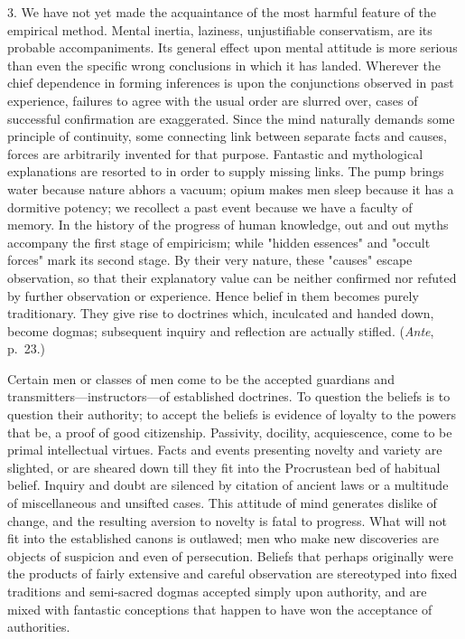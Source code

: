 \documentclass[showtrims,ustradepaper]{memoir}
\begin{document}

3. We have not yet made the acquaintance of the most harmful feature of
the empirical method. Mental inertia, laziness, unjustifiable
conservatism, are its probable accompaniments. Its general effect upon
mental attitude is more serious than even the specific wrong conclusions
in which it has landed. Wherever the chief dependence in forming
inferences is upon the conjunctions observed in past experience,
failures to agree with the usual order are slurred over, cases of
successful confirmation are exaggerated. Since the mind naturally
demands some principle of continuity, some connecting link between
separate facts and causes, forces are arbitrarily invented for that
purpose. Fantastic and mythological explanations are resorted to in
order to supply missing links. The pump brings water because nature
abhors a vacuum; opium makes men sleep because it has a
dormitive
potency; we recollect a past event because we have a faculty of memory.
In the history of the progress of human knowledge, out and out myths
accompany the first stage of empiricism; while "hidden essences" and
"occult forces" mark its second stage. By their very nature, these
"causes" escape observation, so that their explanatory value can be
neither confirmed nor refuted by further observation or experience.
Hence belief in them becomes purely traditionary. They give rise to
doctrines which, inculcated and handed down, become dogmas; subsequent
inquiry and reflection are actually stifled. (\emph{Ante}, p.\ 23.)


Certain men or classes of men come to be the accepted guardians and
transmitters---instructors---of established doctrines. To question the
beliefs is to question their authority; to accept the beliefs is
evidence of loyalty to the powers that be, a proof of good citizenship.
Passivity, docility, acquiescence, come to be primal intellectual
virtues. Facts and events presenting novelty and variety are slighted,
or are sheared down till they fit into the Procrustean bed of habitual
belief. Inquiry and doubt are silenced by citation of ancient laws or a
multitude of miscellaneous and unsifted cases. This attitude of mind
generates dislike of change, and the resulting aversion to novelty is
fatal to progress. What will not fit into the established canons is
outlawed; men who make new discoveries are objects of suspicion and even
of persecution. Beliefs that perhaps originally were the products of
fairly extensive and careful observation are stereotyped into fixed
traditions and semi-sacred dogmas accepted simply upon authority, and
are mixed with fantastic conceptions that happen to have won the
acceptance of
authorities.
\end{document}
